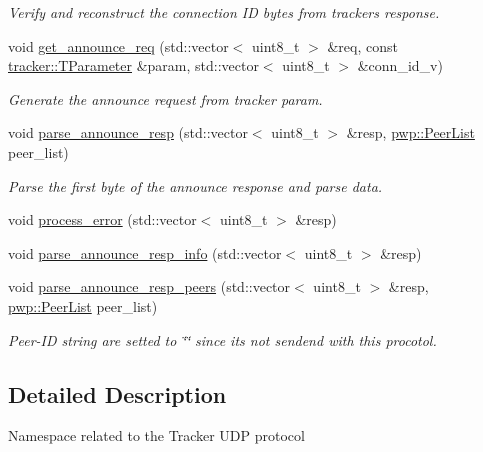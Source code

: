 \begin{DoxyCompactItemize}
\begin{DoxyCompactList}\small\item\em Verify and reconstruct the connection ID bytes from tracker\textquotesingle{}s response. \end{DoxyCompactList}\item 
void \hyperlink{namespacet__udp_a5e968355a7c45dae0749b80e1be8308a}{get\+\_\+announce\+\_\+req} (std\+::vector$<$ uint8\+\_\+t $>$ \&req, const \hyperlink{structtracker_1_1TParameter}{tracker\+::\+T\+Parameter} \&param, std\+::vector$<$ uint8\+\_\+t $>$ \&conn\+\_\+id\+\_\+v)
\begin{DoxyCompactList}\small\item\em Generate the announce request from tracker param. \end{DoxyCompactList}\item 
void \hyperlink{namespacet__udp_a1f2a0ab9801cbc55002e67c166895a0e}{parse\+\_\+announce\+\_\+resp} (std\+::vector$<$ uint8\+\_\+t $>$ \&resp, \hyperlink{namespacepwp_ad07fa6df116b205302ad5ec172277184}{pwp\+::\+Peer\+List} peer\+\_\+list)
\begin{DoxyCompactList}\small\item\em Parse the first byte of the announce response and parse data. \end{DoxyCompactList}\item 
void \hyperlink{namespacet__udp_aab582ebbfac6fd929e811527e44384c1}{process\+\_\+error} (std\+::vector$<$ uint8\+\_\+t $>$ \&resp)
\item 
void \hyperlink{namespacet__udp_a42ced8af1acd3fb2bc46358effe48dbc}{parse\+\_\+announce\+\_\+resp\+\_\+info} (std\+::vector$<$ uint8\+\_\+t $>$ \&resp)
\item 
void \hyperlink{namespacet__udp_a8aa6906fdd81689928634df34688fed1}{parse\+\_\+announce\+\_\+resp\+\_\+peers} (std\+::vector$<$ uint8\+\_\+t $>$ \&resp, \hyperlink{namespacepwp_ad07fa6df116b205302ad5ec172277184}{pwp\+::\+Peer\+List} peer\+\_\+list)
\begin{DoxyCompactList}\small\item\em Peer-\/\+ID string are setted to \char`\"{}\char`\"{} since it\textquotesingle{}s not sendend with this procotol. \end{DoxyCompactList}\end{DoxyCompactItemize}


\subsection{Detailed Description}
Namespace related to the Tracker U\+DP protocol 

